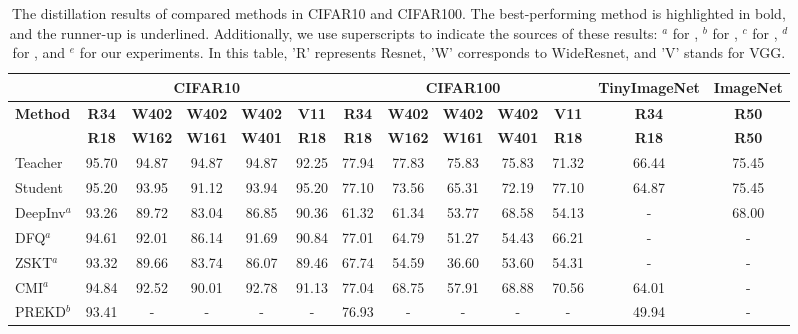 \documentclass{article} %
\begin{document}
\begin{table}[t]
\caption{The distillation results of compared methods in CIFAR10 and CIFAR100.  The best-performing method is highlighted in bold, and the runner-up is underlined. Additionally, we use superscripts to indicate the sources of these results: $^a$ for \cite{fastdfkd}, $^b$ for \cite{kakr}, $^c$ for \cite{mad}, $^d$ for \cite{spshnet}, and $^e$ for our experiments. In this table, 'R' represents Resnet, 'W' corresponds to WideResnet, and 'V' stands for VGG.}
\begin{adjustbox}{width=\linewidth}
\begin{tabular}{lcccccccccccc}
\toprule
\textbf{} &
  \multicolumn{5}{c}{\textbf{CIFAR10}} &
  \multicolumn{5}{c}{\textbf{CIFAR100}} &
  \textbf{TinyImageNet} &
  \textbf{ImageNet} \\ \midrule
\multirow{2}{*}{\textbf{Method}} &
  \textbf{R34} &
  \textbf{W402} &
  \textbf{W402} &
  \textbf{W402} &
  \textbf{V11} &
  \textbf{R34} &
  \textbf{W402} &
  \textbf{W402} &
  \textbf{W402} &
  \textbf{V11} &
  \textbf{R34} &
  \textbf{R50} \\
 &
  \textbf{R18} &
  \textbf{W162} &
  \textbf{W161} &
  \textbf{W401} &
  \textbf{R18} &
  \textbf{R18} &
  \textbf{W162} &
  \textbf{W161} &
  \textbf{W401} &
  \textbf{R18} &
  \textbf{R18} &
  \textbf{R50} \\ \midrule
Teacher &
  95.70 &
  94.87 &
  94.87 &
  94.87 &
  92.25 &
  77.94 &
  77.83 &
  75.83 &
  75.83 &
  71.32 &
  66.44 &
  75.45 \\
Student &
  95.20 &
  93.95 &
  91.12 &
  93.94 &
  95.20 &
  77.10 &
  73.56 &
  65.31 &
  72.19 &
  77.10 &
  64.87 &
  75.45 \\
\midrule
DeepInv$^a$ \citep{adi}&
  93.26 &
  89.72 &
  83.04 &
  86.85 &
  90.36 &
  61.32 &
  61.34 &
  53.77 &
  68.58 &
  54.13 &
  - &
  68.00 \\
DFQ$^a$ \citep{dfq}&
  94.61 &
  92.01 &
  86.14 &
  91.69 &
  90.84 &
  77.01 &
  64.79 &
  51.27 &
  54.43 &
  66.21 &
  - &
  - \\
ZSKT$^a$ \citep{zskt}&
  93.32  &
  89.66 &
  83.74 &
  86.07 &
  89.46 &
  67.74 &
  54.59 &
  36.60 &
  53.60 &
  54.31 &
  - &
  - \\
CMI$^a$ \citep{cmi}&
  94.84 &
  92.52 &
  90.01 &
  92.78 &
  91.13 &
  77.04 &
  68.75 &
  57.91 &
  68.88 &
  70.56 &
  64.01 &
  - \\
PREKD$^b$ \citep{predfkd}&
  93.41 &
  - &
  - &
  - &
  - &
  76.93 &
  - &
  - &
  - &
  - &
  49.94 &
  - \\

\end{tabular}
\end{adjustbox}
\end{table}
\end{document}
